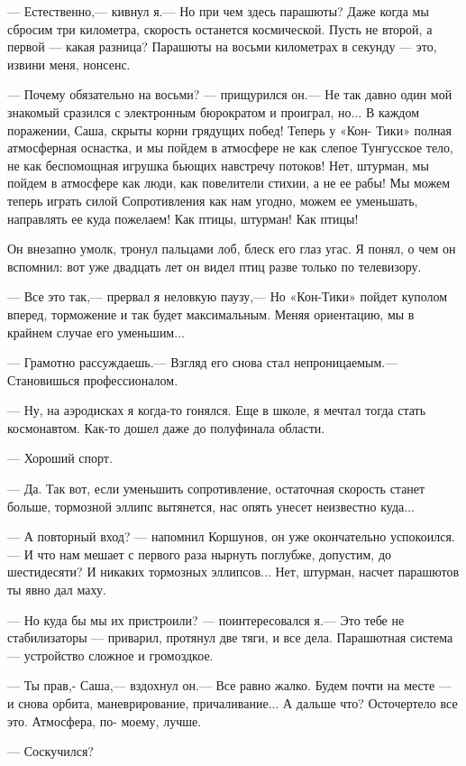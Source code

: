 \documentclass[11pt,a4paper,oneside]{article}
\begin{document}
— Естественно,— кивнул я.— Но при чем здесь парашюты? Даже когда мы сбросим три километра, скорость останется космической. Пусть не второй, а первой — какая разница? Парашюты на восьми километрах в секунду — это, извини меня, нонсенс.

— Почему обязательно на восьми? — прищурился он.— Не так давно один мой знакомый сразился с электронным бюрократом и проиграл, но... В каждом поражении, Саша, скрыты корни грядущих побед! Теперь у «Кон- Тики» полная атмосферная оснастка, и мы пойдем в атмосфере не как слепое Тунгусское тело, не как беспомощная игрушка бьющих навстречу потоков! Нет, штурман, мы пойдем в атмосфере как люди, как повелители стихии, а не ее рабы! Мы можем теперь играть силой Сопротивления как нам угодно, можем ее уменьшать, направлять ее куда пожелаем! Как птицы, штурман! Как птицы!

Он внезапно умолк, тронул пальцами лоб, блеск его глаз угас. Я понял, о чем он вспомнил: вот уже двадцать лет он видел птиц разве только по телевизору.

— Все это так,— прервал я неловкую паузу,— Но «Кон-Тики» пойдет куполом вперед, торможение и так будет максимальным. Меняя ориентацию, мы в крайнем случае его уменьшим...

— Грамотно рассуждаешь.— Взгляд его снова стал непроницаемым.— Становишься профессионалом.

— Ну, на аэродисках я когда-то гонялся. Еще в школе, я мечтал тогда стать космонавтом. Как-то дошел даже до полуфинала области.

— Хороший спорт.

— Да. Так вот, если уменьшить сопротивление, остаточная скорость станет больше, тормозной эллипс вытянется, нас опять унесет неизвестно куда...

— А повторный вход? — напомнил Коршунов, он уже окончательно успокоился.— И что нам мешает с первого раза нырнуть поглубже, допустим, до шестидесяти? И никаких тормозных эллипсов... Нет, штурман, насчет парашютов ты явно дал маху.

— Но куда бы мы их пристроили? — поинтересовался я.— Это тебе не стабилизаторы — приварил, протянул две тяги, и все дела. Парашютная система — устройство сложное и громоздкое.

— Ты прав,- Саша,— вздохнул он.— Все равно жалко. Будем почти на месте — и снова орбита, маневрирование, причаливание... А дальше что? Осточертело все это. Атмосфера, по- моему, лучше.

— Соскучился?
\end{document}
